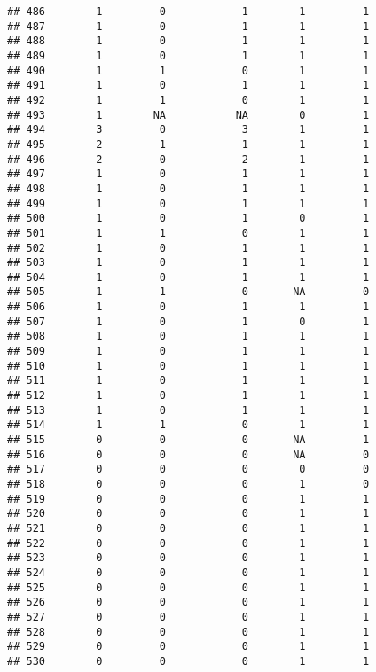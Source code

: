 \documentclass[
]{article}
\begin{document}
\begin{verbatim}
## 486        1         0            1        1         1
## 487        1         0            1        1         1
## 488        1         0            1        1         1
## 489        1         0            1        1         1
## 490        1         1            0        1         1
## 491        1         0            1        1         1
## 492        1         1            0        1         1
## 493        1        NA           NA        0         1
## 494        3         0            3        1         1
## 495        2         1            1        1         1
## 496        2         0            2        1         1
## 497        1         0            1        1         1
## 498        1         0            1        1         1
## 499        1         0            1        1         1
## 500        1         0            1        0         1
## 501        1         1            0        1         1
## 502        1         0            1        1         1
## 503        1         0            1        1         1
## 504        1         0            1        1         1
## 505        1         1            0       NA         0
## 506        1         0            1        1         1
## 507        1         0            1        0         1
## 508        1         0            1        1         1
## 509        1         0            1        1         1
## 510        1         0            1        1         1
## 511        1         0            1        1         1
## 512        1         0            1        1         1
## 513        1         0            1        1         1
## 514        1         1            0        1         1
## 515        0         0            0       NA         1
## 516        0         0            0       NA         0
## 517        0         0            0        0         0
## 518        0         0            0        1         0
## 519        0         0            0        1         1
## 520        0         0            0        1         1
## 521        0         0            0        1         1
## 522        0         0            0        1         1
## 523        0         0            0        1         1
## 524        0         0            0        1         1
## 525        0         0            0        1         1
## 526        0         0            0        1         1
## 527        0         0            0        1         1
## 528        0         0            0        1         1
## 529        0         0            0        1         1
## 530        0         0            0        1         1

\end{verbatim}
\end{document}
